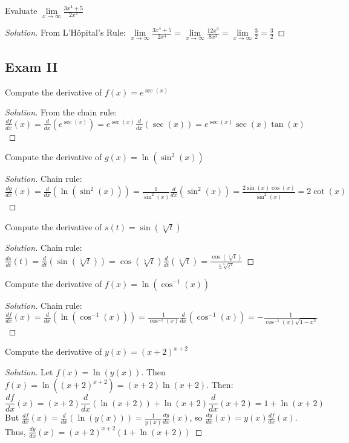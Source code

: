 \documentclass[crop=false,class=book]{standalone}
\begin{document}
\begin{problem}
Evaluate $\underset{x\rightarrow\infty}{\lim}\frac{3x^{4}+5}{2x^{4}}$
\end{problem}
\begin{proof}[Solution]
From L'H\^{o}pital's Rule: $\underset{x\rightarrow\infty}{\lim}\frac{3x^{4}+5}{2x^{4}}=\underset{x\rightarrow\infty}{\lim}\frac{12x^{3}}{8x^{3}}=\underset{x\rightarrow \infty}{\lim}\frac{3}{2}=\frac{3}{2}$
\end{proof}
\subsection{Exam II}
\begin{problem}
Compute the derivative of $f(x)=e^{\sec(x)}$
\end{problem}
\begin{proof}[Solution]
From the chain rule: $\frac{df}{dx}(x)=\frac{d}{dx}(e^{\sec(x)})=e^{\sec(x)}\frac{d}{dx}(\sec(x))=e^{\sec(x)}\sec(x)\tan(x)$
\end{proof}
\begin{problem}
Compute the derivative of $g(x)=\ln(\sin^{2}(x))$
\end{problem}
\begin{proof}[Solution]
Chain rule: $\frac{dg}{dx}(x)=\frac{d}{dx}(\ln(\sin^{2}(x)))=\frac{1}{\sin^{2}(x)}\frac{d}{dx}(\sin^{2}(x))=\frac{2\sin(x)\cos(x)}{\sin^{2}(x)}=2\cot(x)$
\end{proof}
\begin{problem}
Compute the derivative of $s(t)=\sin(\sqrt[5]{t})$
\end{problem}
\begin{proof}[Solution]
Chain rule: $\frac{ds}{dt}(t)=\frac{d}{dt}(\sin(\sqrt[5]{t}))=\cos(\sqrt[5]{t})\frac{d}{dt}(\sqrt[5]{t})=\frac{\cos(\sqrt[5]{t})}{5\sqrt[5]{t^{4}}}$
\end{proof}
\begin{problem}
Compute the derivative of $f(x)=\ln(\cos^{-1}(x))$
\end{problem}
\begin{proof}[Solution]
Chain rule: $\frac{df}{dx}(x)=\frac{d}{dx}(\ln(\cos^{-1}(x)))=\frac{1}{\cos^{-1}(x)}\frac{d}{dx}(\cos^{-1}(x))=-\frac{1}{\cos^{-1}(x)\sqrt{1-x^{2}}}$
\end{proof}
\begin{problem}
Compute the derivative of $y(x)=(x+2)^{x+2}$
\end{problem}
\begin{proof}[Solution]
Let $f(x)=\ln(y(x))$. Then $f(x)=\ln((x+2)^{x+2})=(x+2)\ln(x+2)$. Then:
\begin{equation*}
    \frac{df}{dx}(x)=(x+2)\frac{d}{dx}(\ln(x+2))+\ln(x+2)\frac{d}{dx}(x+2)=1+\ln(x+2)
\end{equation*}
But $\frac{df}{dx}(x)=\frac{d}{dx}(\ln(y(x)))=\frac{1}{y(x)}\frac{dy}{dx}(x)$, so $\frac{dy}{dx}(x)=y(x)\frac{df}{dx}(x)$. Thus, $\frac{dy}{dx}(x)=(x+2)^{x+2}(1+\ln(x+2))$
\end{proof}
\end{document}
